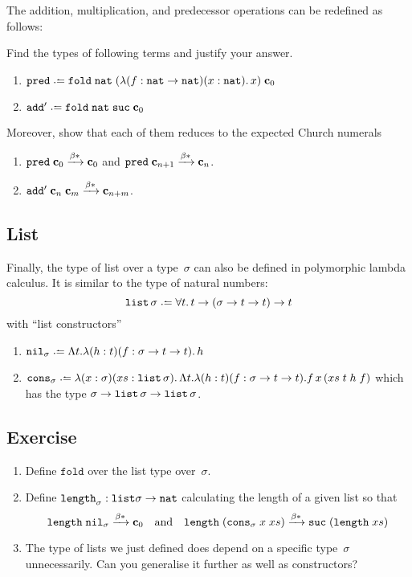 The addition, multiplication, and predecessor operations can be redefined as
follows:
\begin{example}
  Find the types of following terms and justify your answer.
  \begin{enumerate}
    \item $\pred \defeq \mathtt{fold}\;\nat\;(\lambda (f : \nat \to \nat)(x : \nat).\,
      x)\;\bc_0$
    \item $\add' \defeq \mathtt{fold}\;\nat\;\suc\;\bc_0$
  \end{enumerate}
  Moreover, show that each of them reduces to the expected Church numerals
  \begin{enumerate}
    \item $\mathtt{pred}\;\mathbf{c}_0 \xrightarrow{\beta*} \mathbf{c}_0$ and $\mathtt{pred}\;\mathbf{c}_{n+1}
      \xrightarrow{\beta*} \mathbf{c}_n$.
    \item $\mathtt{add}'\;\mathbf{c}_n\;\mathbf{c}_m \xrightarrow{\beta*} \mathbf{c}_{n+m}$.
  \end{enumerate}
\end{example}
\subsection{List}
Finally, the type of list over a type~$\sigma$ can also be defined in
polymorphic lambda calculus. It is similar to the type of natural numbers:
\[
  \List\,\sigma\defeq \forall t.\, t \to (\sigma \to t \to t) \to t 
\]
with ``list constructors'' 
\begin{enumerate}
  \item $\mathtt{nil}_\sigma \defeq \Lambda t.\lambda (h : t)(f :
    \sigma\to t \to t).\, h$
  \item $\mathtt{cons}_\sigma \defeq \lambda (x : \sigma)(xs : \List\,
    \sigma).\,\Lambda t.\lambda(h : t)(f : \sigma\to t \to t).f\,x\,(xs\; t\;
    h\; f)$ which has the type $\sigma \to \mathtt{list}\,\sigma \to  \mathtt{list}\,\sigma$.
  \end{enumerate}
\subsection*{Exercise}
\begin{enumerate}
  \item Define $\mathtt{fold}$ over the list type over~$\sigma$.
  \item Define $\mathtt{length}_{\sigma} : \mathtt{list} \sigma \to \mathtt{nat}$ calculating
    the length of a given list so that
    \[
      \mathtt{length}\;\mathtt{nil}_\sigma \xrightarrow{\beta*} \mathbf{c}_0
      \quad\text{and}\quad
      \mathtt{length}\;(\mathtt{cons}_\sigma\;x\;xs)
      \xrightarrow{\beta*} \mathtt{suc}\;(\mathtt{length}\;xs) 
    \]
  \item The type of lists we just defined does depend on a specific
    type~$\sigma$ unnecessarily. Can you generalise it further as well as
    constructors?
  \end{enumerate}

